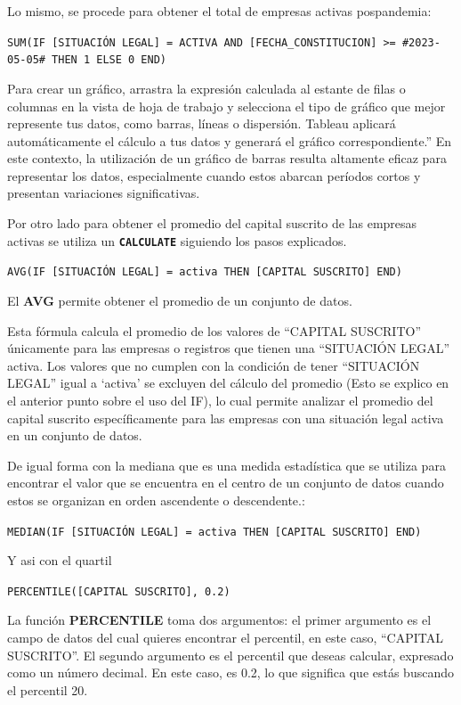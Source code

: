 \documentclass[
]{article}
\begin{document}
Lo mismo, se procede para obtener el total de empresas activas
pospandemia:

\texttt{SUM(IF\ {[}SITUACIÓN\ LEGAL{]}\ =\ \textquotesingle{}ACTIVA\textquotesingle{}\ AND\ {[}FECHA\_CONSTITUCION{]}\ \textgreater{}=\ \#2023-05-05\#\ THEN\ 1\ ELSE\ 0\ END)}

Para crear un gráfico, arrastra la expresión calculada al estante de
filas o columnas en la vista de hoja de trabajo y selecciona el tipo de
gráfico que mejor represente tus datos, como barras, líneas o
dispersión. Tableau aplicará automáticamente el cálculo a tus datos y
generará el gráfico correspondiente.'' En este contexto, la utilización
de un gráfico de barras resulta altamente eficaz para representar los
datos, especialmente cuando estos abarcan períodos cortos y presentan
variaciones significativas.

Por otro lado para obtener el promedio del capital suscrito de las
empresas activas se utiliza un \textbf{\texttt{CALCULATE}} siguiendo los
pasos explicados.

\texttt{AVG(IF\ {[}SITUACIÓN\ LEGAL{]}\ =\ \textquotesingle{}activa\textquotesingle{}\ THEN\ {[}CAPITAL\ SUSCRITO{]}\ END)}

El \textbf{AVG} permite obtener el promedio de un conjunto de datos.

Esta fórmula calcula el promedio de los valores de ``CAPITAL SUSCRITO''
únicamente para las empresas o registros que tienen una ``SITUACIÓN
LEGAL'' activa. Los valores que no cumplen con la condición de tener
``SITUACIÓN LEGAL'' igual a `activa' se excluyen del cálculo del
promedio (Esto se explico en el anterior punto sobre el uso del IF), lo
cual permite analizar el promedio del capital suscrito específicamente
para las empresas con una situación legal activa en un conjunto de
datos.

De igual forma con la mediana que es una medida estadística que se
utiliza para encontrar el valor que se encuentra en el centro de un
conjunto de datos cuando estos se organizan en orden ascendente o
descendente.:

\texttt{MEDIAN(IF\ {[}SITUACIÓN\ LEGAL{]}\ =\ \textquotesingle{}activa\textquotesingle{}\ THEN\ {[}CAPITAL\ SUSCRITO{]}\ END)}

Y asi con el quartil

\texttt{PERCENTILE({[}CAPITAL\ SUSCRITO{]},\ 0.2)}

La función \textbf{PERCENTILE} toma dos argumentos: el primer argumento
es el campo de datos del cual quieres encontrar el percentil, en este
caso, ``CAPITAL SUSCRITO''. El segundo argumento es el percentil que
deseas calcular, expresado como un número decimal. En este caso, es 0.2,
lo que significa que estás buscando el percentil 20.
\end{document}
